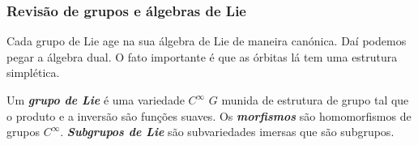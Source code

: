 \subsubsection{Revis\~ao de grupos e \'algebras de Lie}

Cada grupo de Lie age na sua \'algebra de Lie de maneira can\'onica. Da\'i podemos pegar a \'algebra dual. O fato importante \'e que as \'orbitas l\'a tem uma estrutura simpl\'etica.

\begin{defn}
	Um \textit{\textbf{grupo de Lie}} \'e uma variedade $C^\infty$ $G$ munida de estrutura de grupo tal que o produto e a invers\~ao s\~ao fun\c c\~oes  suaves. Os \textit{\textbf{morfismos}} s\~ao homomorfismos de grupos $C^\infty$. \textit{\textbf{Subgrupos de Lie}} s\~ao subvariedades imersas que s\~ao subgrupos.
\end{defn}

